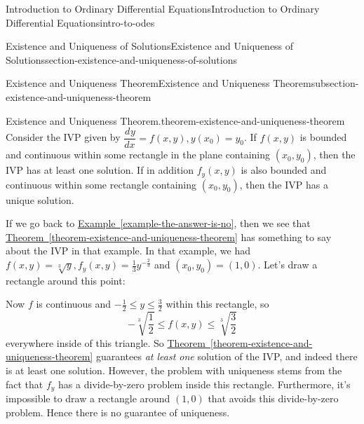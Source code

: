 \documentclass[oneside,10pt,]{book}
\numberwithin{equation}{section}
\newcommand{\dv}[3][]{\dfrac{d^{#1} #2}{d #3^{#1}}}
\begin{document}
\begin{chapterptx}{Introduction to Ordinary Differential Equations}{}{Introduction to Ordinary Differential Equations}{}{}{intro-to-odes}
\begin{sectionptx}{Existence and Uniqueness of Solutions}{}{Existence and Uniqueness of Solutions}{}{}{section-existence-and-uniqueness-of-solutions}
\begin{subsectionptx}{Existence and Uniqueness Theorem}{}{Existence and Uniqueness Theorem}{}{}{subsection-existence-and-uniqueness-theorem}
\begin{theorem}{Existence and Uniqueness Theorem.}{}{theorem-existence-and-uniqueness-theorem}%
\hypertarget{p-96}{}%
Consider the IVP given by \(\dv{y}{x} = f(x,y), y(x_{0}) = y_{0}\). If \(f(x,y)\) is bounded and continuous within some rectangle in the plane containing \((x_{0},y_{0})\), then the IVP has at least one solution. If in addition \(f_{y}(x,y)\) is also bounded and continuous within some rectangle containing \((x_{0},y_{0})\), then the IVP has a unique solution.%
\end{theorem}
\hypertarget{p-97}{}%
If we go back to \hyperref[example-the-answer-is-no]{Example~\ref{example-the-answer-is-no}}, then we see that \hyperref[theorem-existence-and-uniqueness-theorem]{Theorem~\ref{theorem-existence-and-uniqueness-theorem}} has something to say about the IVP in that example. In that example, we had \(f(x,y) = \sqrt[3]{y}, f_{y}(x,y) = \frac{1}{3}y^{-\frac{2}{3}}\) and \((x_{0},y_{0}) = (1,0)\). Let's draw a rectangle around this point: \begin{figure}
\centering
{
}
\end{figure}
%
\par
\hypertarget{p-98}{}%
Now \(f\) is continuous and \(-\frac{1}{2}\leq y\leq\frac{3}{2}\) within this rectangle, so%
\begin{equation*}
-\sqrt[3]{\frac{1}{2}}\leq f(x,y)\leq\sqrt[3]{\frac{3}{2}}
\end{equation*}
everywhere inside of this triangle. So \hyperref[theorem-existence-and-uniqueness-theorem]{Theorem~\ref{theorem-existence-and-uniqueness-theorem}} guarantees \emph{at least one} solution of the IVP, and indeed there is at least one solution. However, the problem with uniqueness stems from the fact that \(f_{y}\) has a divide-by-zero problem inside this rectangle. Furthermore, it's impossible to draw a rectangle around \((1,0)\) that avoids this divide-by-zero problem. Hence there is no guarantee of uniqueness.%

\end{subsectionptx}
\end{sectionptx}
\end{chapterptx}
\end{document}
